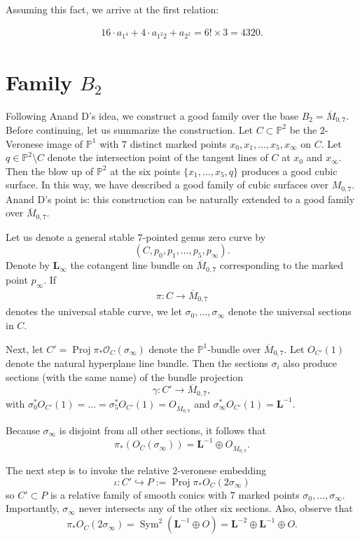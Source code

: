 \documentclass[12 pt]{amsart}
\renewcommand{\P}{\mathbb{P}}
\newcommand{\<}{\left\langle}
\renewcommand{\>}{\right\rangle}
\DeclareMathOperator{\proj}{Proj}
\DeclareMathOperator{\sym}{Sym}
\newcommand{\M}{\overline{M}_{0,7}}
\begin{document}
Assuming this fact, we arrive at the first relation:

\begin{align}
  \label{eq:relation1}
  16 \cdot a_{1^4} + 4 \cdot a_{1^2 2} + a_{2^2} = 6! \times 3 = 4320.
\end{align}

\section{Family $B_2$}
\label{sec:family-b_2}


Following Anand D's idea, we construct a good family over the base
$B_2 = \overline{M}_{0,7}$. Before continuing, let us summarize the
construction. Let $C \subset \P^{2}$ be the $2$-Veronese image of
$\P^{1}$ with $7$ distinct marked points
$x_{0}, x_{1}, \dots, x_{5}, x_{\infty}$ on $C$. Let
$q \in \P^{2} \setminus C$ denote the intersection point of the
tangent lines of $C$ at $x_{0}$ and $x_{\infty}$.  Then the blow up of
$\P^{2}$ at the six points $\{x_{1}, \dots, x_{5}, q\}$ produces a
good cubic surface.  In this way, we have described a good family of
cubic surfaces over $M_{0,7}$.  Anand D's point is: this construction
can be naturally extended to a good family over $\M$.




Let us denote a general stable
$7$-pointed genus zero curve by
$$(C, p_{0}, p_{1}, \dots, p_{5}, p_{\infty}).$$  Denote
by $\mathbf{L}_{\infty}$ the cotangent line bundle on $\M$
corresponding to the marked point $p_{\infty}$. If
\begin{align}
  \label{eq:PM07}
  \pi: C \to \overline{M}_{0,7}
\end{align}
denotes the universal stable curve, we let
$\sigma_{0}, \dots, \sigma_{\infty}$ denote the universal sections in
$C$.

Next, let $C' = \proj \pi_{*}\mathcal{O}_{C}(\sigma_{\infty})$ denote
the $\P^{1}$-bundle over $\overline{M}_{0,7}$. Let $O_{C'}(1)$ denote
the natural hyperplane line bundle.  Then the sections $\sigma_{i}$
also produce sections (with the same name) of the bundle projection
$$\gamma : C' \to \M,$$ with
$\sigma_{0}^{*}O_{C'}(1) = \dots = \sigma_{5}^{*}O_{C'}(1) = O_{\M}$
and $\sigma_{\infty}^{*}O_{C'}(1) = \mathbf{L}^{-1}$.

Because $\sigma_{\infty}$ is disjoint from all other sections, it
follows that
$$\pi_{*}(O_{C}(\sigma_{\infty})) = \mathbf{L}^{-1} \oplus O_{\M}.$$


The next step is to invoke the relative $2$-veronese
embedding
$$\iota: C' \hookrightarrow P := \proj
\pi_{*}O_{C}(2\sigma_{\infty})$$ so $C' \subset P$ is a relative
family of smooth conics with $7$ marked points
$\sigma_{0}, \dots, \sigma_{\infty}$.  Importantly, $\sigma_{\infty}$
never intersects any of the other six sections.  Also, observe that
$$\pi_{*}O_{C}(2 \sigma_{\infty}) = \sym^{2}(\mathbf{L}^{-1} \oplus
O) = \mathbf{L}^{-2} \oplus \mathbf{L}^{-1} \oplus O.$$
\end{document}
